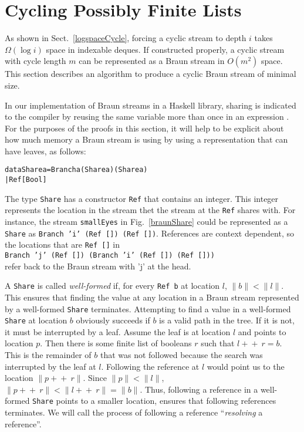 \documentclass[envcountsect]{llncs}
\newcommand{\ord}[1]{\|#1\|}
\newcommand{\app}{+\!\!\!+\ }
\newcommand{\share}{{\tt Share} }
\begin{document}
\section{Cycling Possibly Finite Lists}

As shown in Sect.~\ref{logspaceCycle}, forcing a cyclic stream to depth $i$ takes $\Omega(\log i)$ space in indexable deques.
If constructed properly, a cyclic stream with cycle length $m$ can be represented as a Braun stream in $O(m^2)$ space.
This section describes an algorithm to produce a cyclic Braun stream of minimal size.

In our implementation of Braun streams in a Haskell library, sharing is indicated to the compiler by reusing the same variable more than once in an expression \cite{website}.
For the purposes of the proofs in this section, it will help to be explicit about how much memory a Braun stream is using by using a representation that can have leaves, as follows:

\begin{alltt}
data Share a = Branch a (Share a) (Share a)
             | Ref [Bool]
\end{alltt}

The type \share has a constructor {\tt Ref} that contains an integer.
This integer represents the location in the stream thet the stream at the {\tt Ref} shares with.
For instance, the stream {\tt smallEyes} in Fig.~\ref{braunShare} could be represented as a \share as {\tt Branch 'i' (Ref []) (Ref [])}.
References are context dependent, so the locations that are {\tt Ref []} in 
\\
{\tt Branch 'j' (Ref []) (Branch 'i' (Ref []) (Ref []))}
\\
refer back to the Braun stream with 'j' at the head.


A \share is called {\em well-formed} if, for every {\tt Ref b} at location $l$, $\ord{b} < \ord{l}$.
This ensures that finding the value at any location in a Braun stream represented by a well-formed \share terminates.
Attempting to find a value in a well-formed \share at location $b$ obviously succeeds if $b$ is a valid path in the tree.
If it is not, it must be interrupted by a leaf.
Assume the leaf is at location $l$ and points to location $p$.
Then there is some finite list of booleans $r$ such that $l \app r = b$.
This is the remainder of $b$ that was not followed because the search was interrupted by the leaf at $l$.
Following the reference at $l$ would point us to the location $\ord{p \app r}$.
Since $\ord{p} < \ord{l}$, $\ord{p \app r} < \ord{l \app r} = \ord{b}$.
Thus, following a reference in a well-formed \share points to a smaller location, ensures that following references terminates.
We will call the process of following a reference ``{\em resolving} a reference''.
\end{document}
